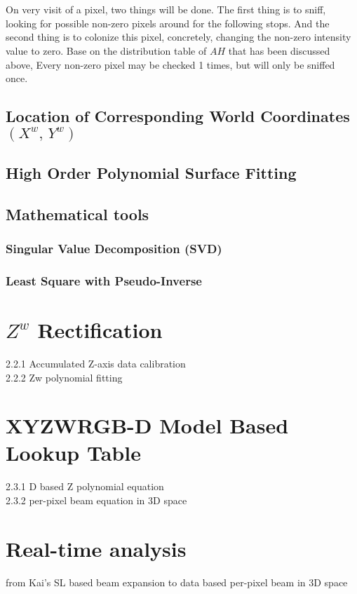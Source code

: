 \\\\%
On very visit of a pixel, two things will be done. The first thing is to sniff, looking for possible non-zero pixels around for the following stops. And the second thing is to colonize this pixel, concretely, changing the non-zero intensity value to zero. Base on the distribution table of \(A\)\texttildelow \(H\) that has been discussed above, %
%
%
Every non-zero pixel may be checked 1 times, but will only be sniffed once.
%
%
\subsection{Location of Corresponding World Coordinates \((X^w, \,Y^w)\)}
%
%
%
%
\subsection{High Order Polynomial Surface Fitting}
%
%
%
%
%
\subsection{Mathematical tools}
\subsubsection{Singular Value Decomposition (SVD)}
\subsubsection{Least Square with Pseudo-Inverse}
%
%
%
%
%
\section{\(Z^{w}\) Rectification}

2.2.1 Accumulated Z-axis data calibration\\
2.2.2 Zw polynomial fitting



\section{XYZWRGB-D Model Based Lookup Table}
2.3.1  D based Z polynomial equation\\
2.3.2 per-pixel beam equation in 3D space



\section{Real-time analysis}
from Kai's SL based beam expansion to data based per-pixel beam in 3D space

